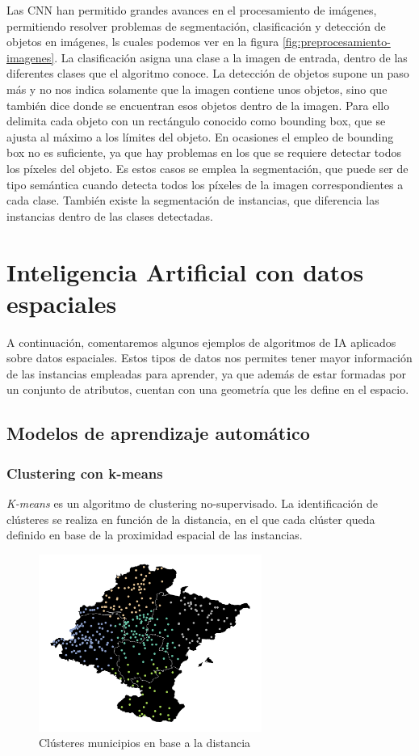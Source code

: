 Las CNN han permitido grandes avances en el procesamiento de imágenes, permitiendo resolver problemas de segmentación, clasificación y detección de objetos en imágenes,
ls cuales podemos ver en la figura \ref{fig:preprocesamiento-imagenes}.
La clasificación asigna una clase a la imagen de entrada, dentro de las diferentes clases que el algoritmo conoce.
La detección de objetos supone un paso más y no nos indica solamente que la imagen contiene unos objetos, sino que también dice donde se encuentran esos objetos dentro de la imagen.
Para ello delimita cada objeto con un rectángulo conocido como bounding box, que se ajusta al máximo a los límites del objeto.
En ocasiones el empleo de bounding box no es suficiente, ya que hay problemas en los que se requiere detectar todos los píxeles del objeto.
Es estos casos se emplea la segmentación, que puede ser de tipo semántica cuando detecta todos los píxeles de la imagen correspondientes a cada clase.
También existe la segmentación de instancias, que diferencia las instancias dentro de las clases detectadas. 

\section{Inteligencia Artificial con datos espaciales}
A continuación, comentaremos algunos ejemplos de algoritmos de IA aplicados sobre datos espaciales. 
Estos tipos de datos nos permites tener mayor información de las instancias empleadas para aprender, 
ya que además de estar formadas por un conjunto de atributos, cuentan con una geometría que les define en el espacio.

\subsection{Modelos de aprendizaje automático}

\subsubsection{Clustering con k-means}
\textit{K-means} es un algoritmo de clustering no-supervisado. 
La identificación de clústeres se realiza en función de la distancia, en el que cada clúster queda definido en base de la proximidad espacial de las instancias.

\begin{figure}[H]
    \centering
    \includegraphics[width=0.65\textwidth]{Imagenes/GeoAI/kmeans.png}
    \caption{Clústeres municipios en base a la distancia} \label{fig:clusteres-municipios}
\end{figure}

